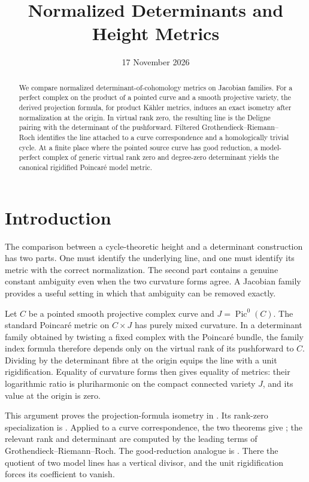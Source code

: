 \documentclass[11pt,a4paper]{article}
\title{Normalized Determinants and Height Metrics}
\author{}
\date{17 November 2026}
\theoremstyle{definition}
\theoremstyle{remark}
\newcommand{\Pic}{\operatorname{Pic}}
\begin{document}
\maketitle
\begin{abstract}
We compare normalized determinant-of-cohomology metrics on Jacobian
families. For a perfect complex on the product of a pointed curve and
a smooth projective variety, the derived projection formula, for product
Kähler metrics, induces an exact isometry after normalization at the origin. In virtual rank zero,
the resulting line is the Deligne pairing with the determinant of the
pushforward. Filtered Grothendieck--Riemann--Roch identifies the line
attached to a curve correspondence and a homologically trivial cycle.
At a finite place where the pointed source curve has good reduction,
a model-perfect complex of generic virtual rank zero and degree-zero
determinant yields the canonical rigidified Poincar\'e model metric.
\end{abstract}
\tableofcontents

\section{Introduction}
The comparison between a cycle-theoretic height and a determinant
construction has two parts. One must identify the underlying line, and
one must identify its metric with the correct normalization. The second
part contains a genuine constant ambiguity even when the two curvature
forms agree. A Jacobian family provides a useful setting in which that
ambiguity can be removed exactly.

Let \(C\) be a pointed smooth projective complex curve and
\(J=\Pic^0(C)\). The standard Poincar\'e metric on \(C\times J\)
has purely mixed curvature. In a determinant family obtained by
twisting a fixed complex with the Poincar\'e bundle, the family index
formula therefore depends only on the virtual rank of its pushforward
to \(C\). Dividing by the determinant fibre at the origin equips the
line with a unit rigidification. Equality of curvature forms then gives
equality of metrics: their logarithmic ratio is pluriharmonic on the
compact connected variety \(J\), and its value at the origin is zero.

This argument proves the projection-formula isometry in
. Its rank-zero specialization is
. Applied to a curve correspondence, the two
theorems give ; the relevant rank and
determinant are computed by the leading terms of
Grothendieck--Riemann--Roch. The good-reduction analogue is
. There the quotient of two model lines has a
vertical divisor, and the unit rigidification forces its coefficient
to vanish.
\end{document}
